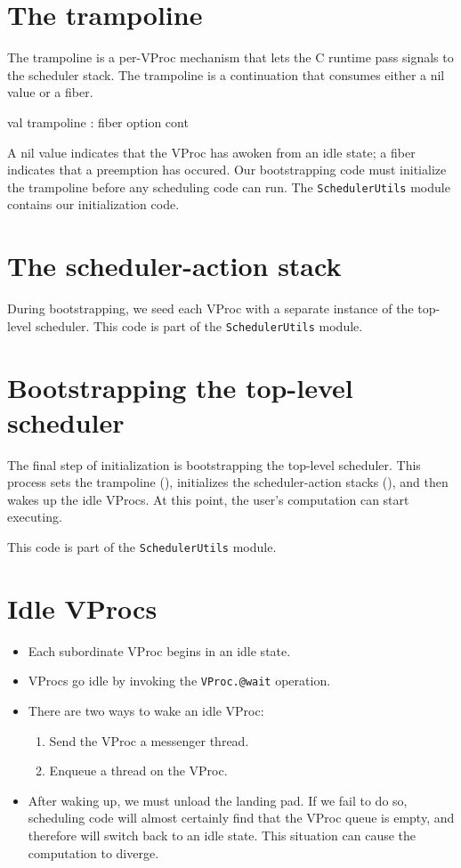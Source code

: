 \documentclass[11pt]{article}
\begin{document}
\section{The trampoline}
\label{sec:trampoline}
The trampoline is a per-VProc mechanism that lets the C runtime pass signals to the scheduler stack. The 
trampoline is a continuation that consumes either a nil value or a fiber. 
\begin{centercode}
val trampoline : fiber option cont
\end{centercode}
A nil value indicates that the VProc has awoken from an idle state; a fiber indicates that a 
preemption has occured.
Our bootstrapping code must initialize the trampoline before any scheduling code can run. The
\texttt{SchedulerUtils} module contains our initialization code.

\section{The scheduler-action stack}
\label{sec:action-stack}
During bootstrapping, we seed each VProc with a separate instance of the top-level scheduler. This code
is part of the \texttt{SchedulerUtils} module.

\section{Bootstrapping the top-level scheduler}
The final step of initialization is bootstrapping the top-level scheduler. This process sets the trampoline
(), initializes the scheduler-action stacks (), and then
wakes up the idle VProcs.
At this point, the user's computation can start executing.

This code is part of the \texttt{SchedulerUtils} module.

\section{Idle VProcs}
\begin{itemize}
  \item Each subordinate VProc begins in an idle state.
  \item VProcs go idle by invoking the \texttt{VProc.@wait} operation.
  \item There are two ways to wake an idle VProc:
    \begin{enumerate}
      \item Send the VProc a messenger thread.
      \item Enqueue a thread on the VProc.
    \end{enumerate}
  \item After waking up, we must unload the landing pad. If we fail to do so, scheduling code will almost
    certainly find that the VProc queue is empty, and therefore will switch back to an idle state. This
    situation can cause the computation to diverge.
\end{itemize}
\end{document}
